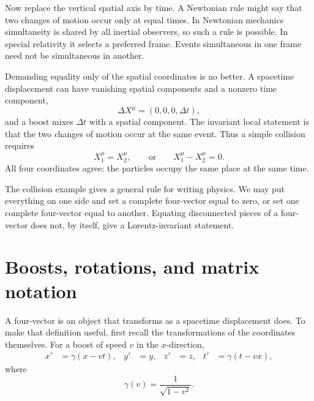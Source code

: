 Now replace the vertical spatial axis by time. A Newtonian rule might say
that two changes of motion occur only at equal times. In Newtonian mechanics
simultaneity is shared by all inertial observers, so such a rule is possible.
In special relativity it selects a preferred frame. Events simultaneous in
one frame need not be simultaneous in another.

Demanding equality only of the spatial coordinates is no better. A
spacetime displacement can have vanishing spatial components and a nonzero
time component,
\begin{equation}
  \Delta X^\mu=(0,0,0,\Delta t),
\end{equation}
and a boost mixes \(\Delta t\) with a spatial component. The invariant local
statement is that the two changes of motion occur at the same event. Thus a
simple collision requires
\begin{equation}
  X_1^\mu=X_2^\mu,
  \qquad\text{or}\qquad
  X_1^\mu-X_2^\mu=0.
\end{equation}
All four coordinates agree: the particles occupy the same place at the same
time.

The collision example gives a general rule for writing physics. We may put
everything on one side and set a complete four-vector equal to zero, or set
one complete four-vector equal to another. Equating disconnected pieces of
a four-vector does not, by itself, give a Lorentz-invariant statement.

\section{Boosts, rotations, and matrix notation}

A four-vector is an object that transforms as a spacetime displacement does.
To make that definition useful, first recall the transformations of the
coordinates themselves. For a boost of speed \(v\) in the \(x\)-direction,
\begin{align}
  x'&=\gamma(x-vt), & y'&=y, & z'&=z,
  & t'&=\gamma(t-vx),                                      \label{eq:l6-boost}
\end{align}
where
\begin{equation}
  \gamma(v)=\frac{1}{\sqrt{1-v^2}}.
\end{equation}

\begin{classroomqa}
\end{classroomqa}

